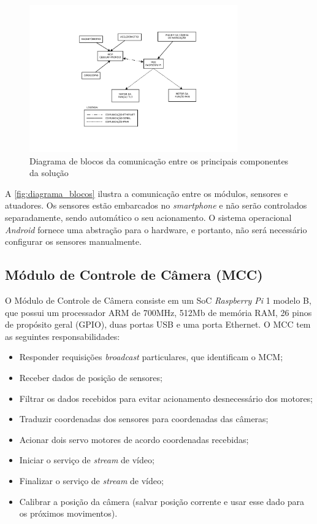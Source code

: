 \begin{figure}[H]
	\centering
	\includegraphics[trim={6cm 3cm 5cm 3cm},clip,width=0.8\textwidth]{figuras/diagrama-modulos-eps-converted-to.pdf}
	\caption{Diagrama de blocos da comunicação entre os principais componentes da solução}
	\label{fig:diagrama_blocos}
\end{figure}

A \autoref{fig:diagrama_blocos} ilustra a comunicação entre os módulos, sensores e atuadores. Os sensores estão embarcados no \textit{smartphone} e não serão controlados separadamente, sendo automático o seu acionamento. O sistema operacional \textit{Android} fornece uma abstração para o hardware, e portanto, não será necessário configurar os sensores manualmente.

\subsection{Módulo de Controle de Câmera (MCC)}
\label{subsec:modconcam}

O Módulo de Controle de Câmera consiste em um SoC \textit{Raspberry Pi} 1 modelo B, que possui um processador ARM de 700MHz, 512Mb de memória RAM, 26 pinos de propósito geral (GPIO), duas portas USB e uma porta Ethernet. O MCC tem as seguintes responsabilidades:

\begin{itemize}
	\item Responder requisições \textit{broadcast} particulares, que identificam o MCM;
	\item Receber dados de posição de sensores;
	\item Filtrar os dados recebidos para evitar acionamento desnecessário dos motores;
	\item Traduzir coordenadas dos sensores para coordenadas das câmeras;
	\item Acionar dois servo motores de acordo coordenadas recebidas;
	\item Iniciar o serviço de \textit{stream} de vídeo;
	\item Finalizar o serviço de \textit{stream} de vídeo;
	\item Calibrar a posição da câmera (salvar posição corrente e usar esse dado para os próximos movimentos).
\end{itemize}

